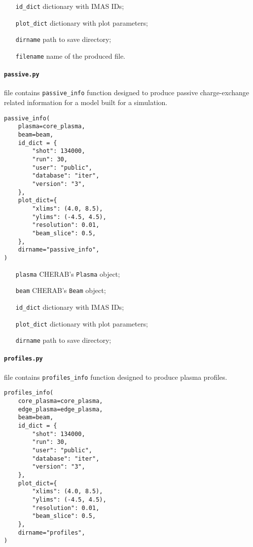 \documentclass[../../main.tex]{subfiles}
\begin{document}
\begin{itemize}[align=left]
    \item[\texttt{id\_dict}] dictionary with IMAS IDs;
    \item[\texttt{plot\_dict}] dictionary with plot parameters;
    \item[\texttt{dirname}] path to save directory;
    \item[\texttt{filename}] name of the produced file.
\end{itemize}

\paragraph{\texttt{passive.py}} file contains \texttt{passive\_info} function designed to produce passive charge-exchange related information for a model built for a simulation.

\begin{verbatim}
passive_info(
    plasma=core_plasma,
    beam=beam,
    id_dict = {
        "shot": 134000,
        "run": 30,
        "user": "public",
        "database": "iter",
        "version": "3",
    },
    plot_dict={
        "xlims": (4.0, 8.5),
        "ylims": (-4.5, 4.5),
        "resolution": 0.01,
        "beam_slice": 0.5,
    },
    dirname="passive_info",
)
\end{verbatim}

\begin{itemize}[align=left]
    \item[\texttt{plasma}] CHERAB's \texttt{Plasma} object;
    \item[\texttt{beam}] CHERAB's \texttt{Beam} object;
    \item[\texttt{id\_dict}] dictionary with IMAS IDs;
    \item[\texttt{plot\_dict}] dictionary with plot parameters;
    \item[\texttt{dirname}] path to save directory;
\end{itemize}

\paragraph{\texttt{profiles.py}} file contains \texttt{profiles\_info} function designed to produce plasma profiles.

\begin{verbatim}
profiles_info(
    core_plasma=core_plasma,
    edge_plasma=edge_plasma,
    beam=beam,
    id_dict = {
        "shot": 134000,
        "run": 30,
        "user": "public",
        "database": "iter",
        "version": "3",
    },
    plot_dict={
        "xlims": (4.0, 8.5),
        "ylims": (-4.5, 4.5),
        "resolution": 0.01,
        "beam_slice": 0.5,
    },
    dirname="profiles",
)
\end{verbatim}
\end{document}
